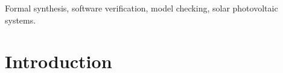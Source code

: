 \documentclass[journal]{IEEEtran}
\begin{document}
\begin{IEEEkeywords}
Formal synthesis, software verification, model checking, solar photovoltaic systems.
\end{IEEEkeywords}

%
\IEEEpeerreviewmaketitle



\section{Introduction}
% 
% 
% 
% 
%
%
\end{document}
